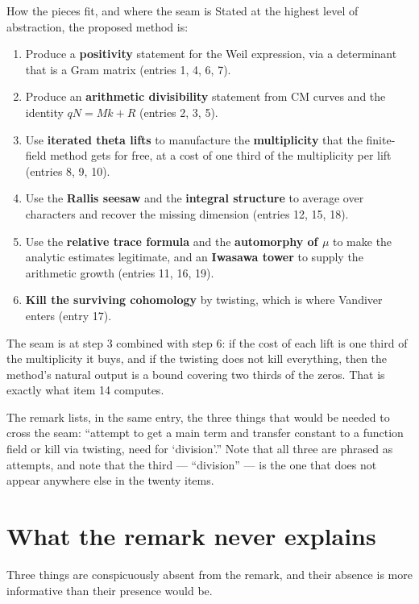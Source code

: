 \begin{deeper}{How the pieces fit, and where the seam is}
Stated at the highest level of abstraction, the proposed method is:

\begin{enumerate}
\item Produce a \textbf{positivity} statement for the Weil expression, via a
determinant that is a Gram matrix (entries 1, 4, 6, 7).
\item Produce an \textbf{arithmetic divisibility} statement from CM curves and
the identity $qN = Mk + R$ (entries 2, 3, 5).
\item Use \textbf{iterated theta lifts} to manufacture the \textbf{multiplicity}
that the finite-field method gets for free, at a cost of one third of the
multiplicity per lift (entries 8, 9, 10).
\item Use the \textbf{Rallis seesaw} and the \textbf{integral structure} to
average over characters and recover the missing dimension (entries 12, 15, 18).
\item Use the \textbf{relative trace formula} and the \textbf{automorphy of
$\mu$} to make the analytic estimates legitimate, and an \textbf{Iwasawa tower}
to supply the arithmetic growth (entries 11, 16, 19).
\item \textbf{Kill the surviving cohomology} by twisting, which is where
Vandiver enters (entry 17).
\end{enumerate}

The seam is at step 3 combined with step 6: if the cost of each lift is one
third of the multiplicity it buys, and if the twisting does not kill
everything, then the method's natural output is a bound covering two thirds of
the zeros. That is exactly what item 14 computes.

The remark lists, in the same entry, the three things that would be needed to
cross the seam: ``attempt to get a main term and transfer constant to a
function field or kill via twisting, need for `division'.'' Note that all three
are phrased as attempts, and note that the third --- ``division'' --- is the
one that does not appear anywhere else in the twenty items.
\end{deeper}

\section{What the remark never explains}Three things are conspicuously absent from the remark, and their absence is
more informative than their presence would be.

